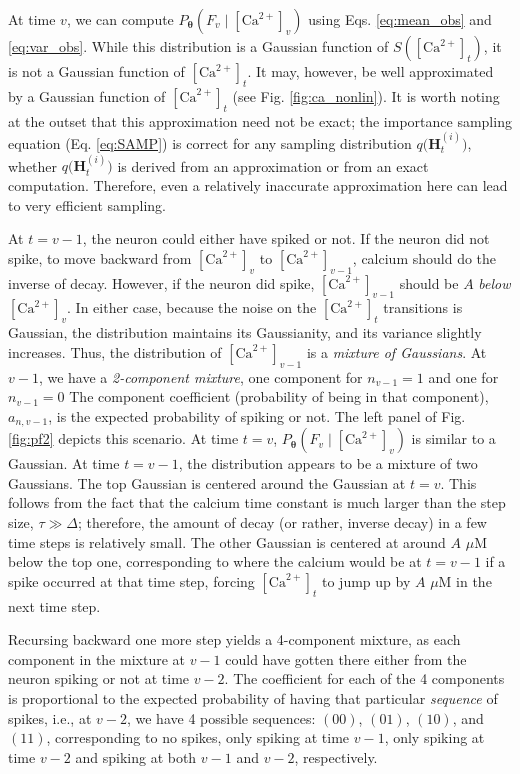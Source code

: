 \documentclass[12pt]{article}
\providecommand{\ve}[1]{\boldsymbol{#1}}
\providecommand{\ve}[1]{\boldsymbol{#1}}
\newcommand{\thetn}{\ve{\theta}}
\newcommand{\p}{P_{\thetn}}
\newcommand{\q}{q\big(\ve{H}_t^{(i)}\big)}
\newcommand{\Ca}{[\text{Ca}^{2+}]}
\begin{document}
At time $v$, we can compute $\p(F_v \mid \Ca_v)$ using Eqs. \ref{eq:mean_obs} and \ref{eq:var_obs}. While this distribution is a Gaussian function of $S(\Ca_t)$, it is not a Gaussian function of $\Ca_t$. It may, however, be well approximated by a Gaussian function of $\Ca_t$ (see Fig. \ref{fig:ca_nonlin}).  It is worth noting at the outset that this approximation need not be exact; the importance sampling equation (Eq. \ref{eq:SAMP}) is correct for any sampling distribution $\q$, whether $\q$ is derived from an approximation or from an exact computation.  Therefore, even a relatively inaccurate approximation here can lead to very efficient sampling. 

At $t=v-1$, the neuron could either have spiked or not. If the neuron did not spike, to move backward from $\Ca_v$ to $\Ca_{v-1}$, calcium should do the inverse of decay.  However, if the neuron did spike, $\Ca_{v-1}$ should be $A$ \emph{below} $\Ca_v$.  In either case, because the noise on the $\Ca_t$ transitions is Gaussian, the distribution maintains its Gaussianity, and its variance slightly increases.  Thus, the distribution of $\Ca_{v-1}$ is a \emph{mixture of Gaussians}.  At $v-1$, we have a \emph{2-component mixture}, one component for $n_{v-1}=1$ and one for $n_{v-1}=0$ The component coefficient (probability of being in that component), $a_{n,v-1}$, is the expected probability of spiking or not. The left panel of Fig. \ref{fig:pf2} depicts this scenario.  At time $t=v$, $\p(F_v \mid \Ca_v)$ is similar to a Gaussian.  At time $t=v-1$, the distribution appears to be a mixture of two Gaussians. The top Gaussian is centered around the Gaussian at $t=v$.  This follows from the fact that the calcium time constant is much larger than the step size, $\tau \gg \Delta$; therefore, the amount of decay (or rather, inverse decay) in a few time steps is relatively small. The other Gaussian is centered at around $A$ $\mu$M below the top one, corresponding to where the calcium would be at $t=v-1$ if a spike occurred at that time step, forcing $\Ca_t$ to jump up by $A$ $\mu$M in the next time step.  

Recursing backward one more step yields a 4-component mixture, as each component in the mixture at $v-1$ could have gotten there either from the neuron spiking or not at time $v-2$.  The coefficient for each of the 4 components is proportional to the expected probability of having that particular \emph{sequence} of spikes, i.e., at $v-2$, we have 4 possible sequences: $(00)$, $(01)$, $(10)$, and $(11)$, corresponding to no spikes, only spiking at time $v-1$, only spiking at time $v-2$ and spiking at both $v-1$ and $v-2$, respectively.
\end{document}
